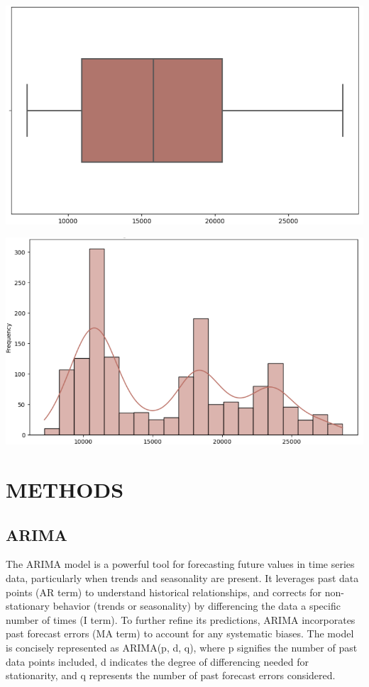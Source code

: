 \documentclass[conference]{IEEEtran}
\begin{document}
\begin{minipage}{0.23\textwidth}
    \centering
    \includegraphics[width=\linewidth]{images/mbb_boxplot.png}
    \label{fig:image1}
\end{minipage}
\hfill
\begin{minipage}{0.23\textwidth}
    \centering
    \includegraphics[width=\linewidth]{images/mbb_histogram.png}
    \label{fig:image2}
\end{minipage}


\section{METHODS}
\subsection{ARIMA}

The ARIMA model is a powerful tool for forecasting future values in time series data, particularly when trends and seasonality are present. It leverages past data points (AR term) to understand historical relationships, and corrects for non-stationary behavior (trends or seasonality) by differencing the data a specific number of times (I term). To further refine its predictions, ARIMA incorporates past forecast errors (MA term) to account for any systematic biases. The model is concisely represented as ARIMA(p, d, q), where p signifies the number of past data points included, d indicates the degree of differencing needed for stationarity, and q represents the number of past forecast errors considered.
\end{document}
